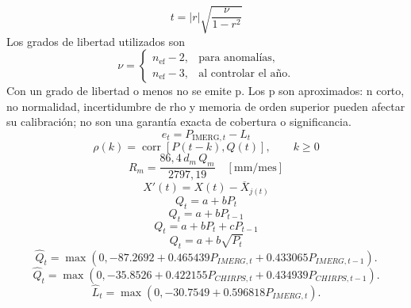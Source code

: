 \documentclass[10pt]{article}
\begin{document}
\begin{equation}
t=|r|\sqrt{\frac{\nu}{1-r^2}}\tag{5.4}
\end{equation}
Los grados de libertad utilizados son
\begin{equation}
\nu=\begin{cases}n_{\mathrm{ef}}-2,&\text{para anomalías},\\n_{\mathrm{ef}}-3,&\text{al controlar el año}.\end{cases}\tag{5.5}
\end{equation}
 Con un grado de libertad o menos no se emite p. Los p son aproximados: n corto, no normalidad, incertidumbre de rho y memoria de orden superior pueden afectar su calibración; no son una garantía exacta de cobertura o significancia.
\newpage
\begin{equation}
e_t=P_{\mathrm{IMERG},t}-L_t\tag{2.1}
\end{equation}
\newpage
\begin{equation}
\rho(k)=\operatorname{corr}\!\left[P(t-k),Q(t)\right],\qquad k\geq 0\tag{2.2}
\end{equation}
\newpage
\begin{equation}
R_m=\frac{86{,}4\,d_m\,Q_m}{2797{,}19}\quad[\mathrm{mm/mes}]\tag{2.3}
\end{equation}
\newpage
\begin{equation}
X'(t)=X(t)-\overline{X}_{j(t)}\tag{2.4}
\end{equation}
\newpage
\begin{equation}
Q_t=a+bP_t\tag{2.5}
\end{equation}
\newpage
\begin{equation}
Q_t=a+bP_{t-1}\tag{2.6}
\end{equation}
\newpage
\begin{equation}
Q_t=a+bP_t+cP_{t-1}\tag{2.7}
\end{equation}
\newpage
\begin{equation}
Q_t=a+b\sqrt{P_t}\tag{2.8}
\end{equation}
\newpage
\begin{equation}
\widehat{Q}_t=\max\left(0,-87.2692+0.465439P_{IMERG,t}+0.433065P_{IMERG,t-1}\right).\tag{2.9}
\end{equation}
\newpage
\begin{equation}
\widehat{Q}_t=\max\left(0,-35.8526+0.422155P_{CHIRPS,t}+0.434939P_{CHIRPS,t-1}\right).\tag{2.10}
\end{equation}
\newpage
\begin{equation}
\widehat{L}_t=\max\left(0,-30.7549+0.596818P_{IMERG,t}\right).\tag{2.11}
\end{equation}
\end{document}
